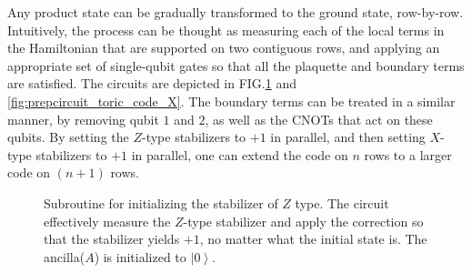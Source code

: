 \documentclass[prx,aps,amsmath,amssymb,floatfix,superscriptaddress,11pt,tightenlines,longbibliography,onecolumn,notitlepage]{revtex4-1}
\newcommand{\ket}[1]{\left|#1\right\rangle}
\begin{document}
Any product state can be gradually transformed to the ground state, row-by-row. Intuitively, the process can be thought as measuring each of the local terms in the Hamiltonian that are supported on two contiguous rows, and applying an appropriate set of single-qubit gates so that all the plaquette and boundary terms are satisfied.\cite{Dennis2001} The circuits are depicted in FIG.\ref{fig:prepcircuit_toric_code_Z} and \ref{fig:prepcircuit_toric_code_X}. The boundary terms can be treated in a similar manner, by removing qubit $1$ and $2$, as well as the CNOTs that act on these qubits. By setting the $Z$-type stabilizers to $+1$ in parallel, and then setting $X$-type stabilizers to $+1$ in parallel, one can extend the code on $n$ rows to a larger code on $(n+1)$ rows.
\begin{figure}[h]
\caption{Subroutine for initializing the stabilizer of $Z$ type. The circuit effectively measure the $Z$-type stabilizer and apply the correction so that the stabilizer yields $+1$, no matter what the initial state is. The ancilla($A$) is initialized to $\ket{0}$.\label{fig:prepcircuit_toric_code_Z}}
\end{figure}
\end{document}
